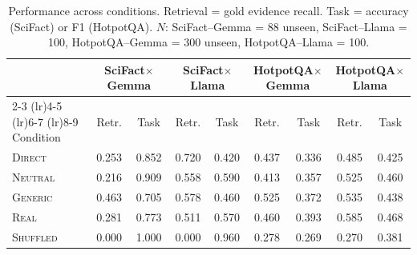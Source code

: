 \begin{table}[t]
\centering
\caption{Performance across conditions. Retrieval = gold evidence recall. Task = accuracy (SciFact) or F1 (HotpotQA). $N$: SciFact--Gemma = 88 unseen, SciFact--Llama = 100, HotpotQA--Gemma = 300 unseen, HotpotQA--Llama = 100.}
\label{tab:conditions}
\small
\begin{tabular}{lcccccccc}
\toprule
& \multicolumn{2}{c}{SciFact$\times$Gemma} & \multicolumn{2}{c}{SciFact$\times$Llama} & \multicolumn{2}{c}{HotpotQA$\times$Gemma} & \multicolumn{2}{c}{HotpotQA$\times$Llama} \\
\cmidrule(lr){2-3} \cmidrule(lr){4-5} \cmidrule(lr){6-7} \cmidrule(lr){8-9}
Condition & Retr. & Task & Retr. & Task & Retr. & Task & Retr. & Task \\
\midrule
\textsc{Direct} & 0.253 & 0.852 & 0.720 & 0.420 & 0.437 & 0.336 & 0.485 & 0.425 \\
\textsc{Neutral} & 0.216 & 0.909 & 0.558 & 0.590 & 0.413 & 0.357 & 0.525 & 0.460 \\
\textsc{Generic} & 0.463 & 0.705 & 0.578 & 0.460 & 0.525 & 0.372 & 0.535 & 0.438 \\
\textsc{Real} & 0.281 & 0.773 & 0.511 & 0.570 & 0.460 & 0.393 & 0.585 & 0.468 \\
\textsc{Shuffled} & 0.000 & 1.000 & 0.000 & 0.960 & 0.278 & 0.269 & 0.270 & 0.381 \\
\bottomrule
\end{tabular}
\end{table}
